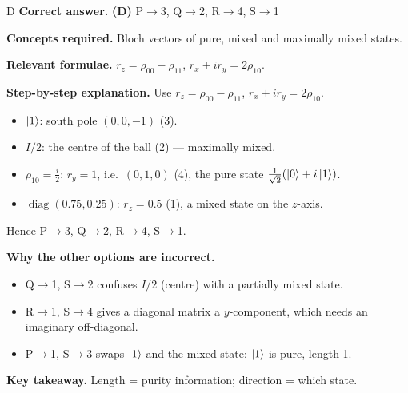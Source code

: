 \documentclass[11pt,a4paper]{article}
\newcommand{\qsep}{\par\vspace{2pt}{\color{black!15}\hrule}\vspace{4pt}}
\begin{document}
\begin{solbox}{D}
\textbf{\color{brand}Correct answer.} \textcolor{okgreen}{\textbf{(D)}} P$\to$3, Q$\to$2, R$\to$4, S$\to$1

\textbf{\color{brand}Concepts required.} Bloch vectors of pure, mixed and maximally mixed states.

\textbf{\color{brand}Relevant formulae.} $r_z = \rho_{00} - \rho_{11}$, $r_x + ir_y = 2\rho_{10}$.

\textbf{\color{brand}Step-by-step explanation.} Use $r_z = \rho_{00} - \rho_{11}$, $r_x + ir_y = 2\rho_{10}$.
\begin{itemize}\itemsep0pt
\item $\ket1$: south pole $(0, 0, -1)$ (3).
\item $I/2$: the centre of the ball (2) --- maximally mixed.
\item $\rho_{10} = \frac i2$: $r_y = 1$, i.e.\ $(0, 1, 0)$ (4), the pure state $\frac{1}{\sqrt2}(\ket0 + i\ket1)$.
\item $\operatorname{diag}(0.75, 0.25)$: $r_z = 0.5$ (1), a mixed state on the $z$-axis.
\end{itemize}
Hence P$\to$3, Q$\to$2, R$\to$4, S$\to$1.

\textbf{\color{brand}Why the other options are incorrect.}
\begin{itemize}[leftmargin=2.4em, itemsep=1pt, topsep=2pt]
\item[\textbf{(A)}] Q$\to$1, S$\to$2 confuses $I/2$ (centre) with a partially mixed state.
\item[\textbf{(B)}] R$\to$1, S$\to$4 gives a diagonal matrix a $y$-component, which needs an imaginary off-diagonal.
\item[\textbf{(C)}] P$\to$1, S$\to$3 swaps $\ket1$ and the mixed state: $\ket1$ is pure, length 1.
\end{itemize}
\textbf{\color{brand}Key takeaway.} Length = purity information; direction = which state.
\end{solbox}
\qsep
\end{document}
